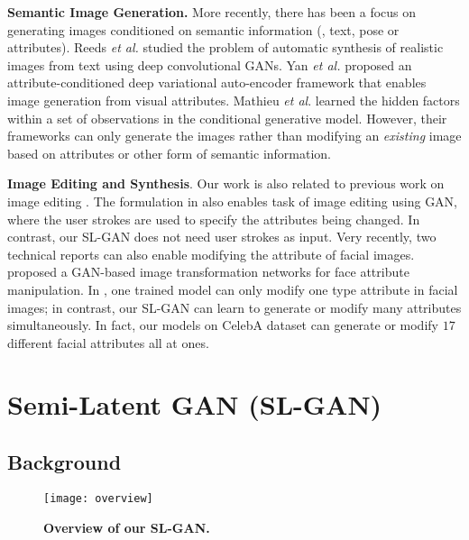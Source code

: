 \documentclass[10pt,letterpaper,twocolumn]{article}
\begin{document}
\vspace{0.07in}
\noindent \textbf{Semantic Image Generation.} More recently, there has been
a focus on generating images conditioned on semantic information (\eg,
text, pose or attributes). Reeds \emph{et al. } \cite{reed2016generative}
studied the problem of automatic synthesis of realistic images from
text using deep convolutional GANs. Yan \emph{et al.} \cite{yan2016eccv}
proposed an attribute-conditioned deep variational auto-encoder framework
that enables image generation from visual attributes. Mathieu \emph{et
al}. \cite{michael2016nips} learned the hidden factors within a set
of observations in the conditional generative model. However, their
frameworks can only generate the images rather than modifying an {\em
existing} image based on attributes or other form of semantic information.

\noindent \textbf{Image Editing and Synthesis}. Our work is also related to
previous work on image editing \cite{Kemelmacher2014cvpr,Guim2016nipsworkshop,wei2017arxiv,zhou2016eccv}.
The formulation in \cite{zhu2015eccv} also enables task of image
editing using GAN, where the user strokes are used to specify the
attributes being changed. In contrast, our SL-GAN does not need user
strokes as input. Very recently, two technical reports \cite{Guim2016nipsworkshop,wei2017arxiv}
can also enable modifying the attribute of facial images. \cite{wei2017arxiv}
proposed a GAN-based image transformation networks for face attribute
manipulation. In \cite{wei2017arxiv}, one trained model can only
modify one type attribute in facial images; in contrast, our SL-GAN
can learn to generate or modify many attributes simultaneously. In
fact, our models on CelebA dataset can generate or modify $17$ different
facial attributes all at ones.

\section{Semi-Latent GAN (SL-GAN)}

\subsection{Background}

\noindent 
\begin{figure}
\begin{centering}
\texttt{[image: overview]} 
\par\end{centering}
\caption{\label{fig:Overview-of-our} \textbf{Overview of our SL-GAN.}}
\end{figure}
\end{document}
